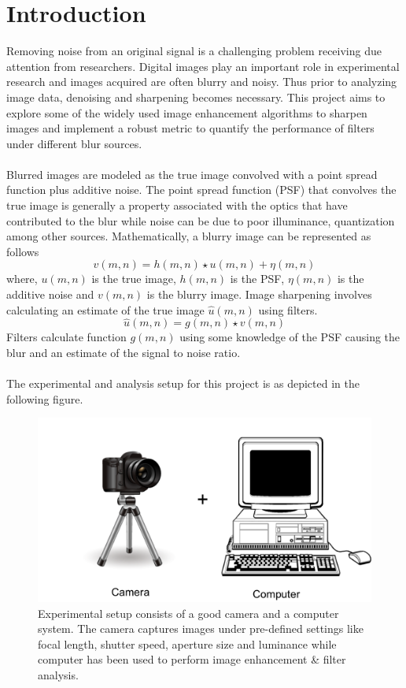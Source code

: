 \graphicspath{{put_your_path/}}%

\chapter{Introduction}
Removing noise from an original signal is a challenging problem receiving due attention from researchers. Digital images play an important role in experimental research and images acquired are often blurry and noisy. Thus prior to analyzing image data, denoising and sharpening becomes necessary. This project aims to explore some of the widely used image enhancement algorithms to sharpen images and implement a robust metric to quantify the performance of filters under different blur sources.\\

\\
Blurred images are modeled as the true image convolved with a point spread function plus additive noise. The point spread function (PSF) that convolves the true image is generally a property associated with the optics that have contributed to the blur while noise can be due to poor illuminance, quantization among other sources. Mathematically, a blurry image can be represented as follows\\
\begin{equation}
v(m,n)= h(m,n) \star u(m,n) + \eta(m,n)
\end{equation}
where, $u(m,n)$ is the true image, $h(m,n)$ is the PSF, $\eta(m,n)$ is the additive noise and $v(m,n)$ is the blurry image. Image sharpening involves calculating an estimate of the true image $\hat{u}(m,n)$ using filters.
\begin{equation}
\hat{u}(m,n)= g(m,n) \star v(m,n)
\end{equation}
Filters calculate function $g(m,n)$ using some knowledge of the PSF causing the blur and an estimate of the signal to noise ratio.\\

\\
The experimental and analysis setup for this project is as depicted in the following figure.
\begin{figure}[h!]
  \centering
                \centering
                \includegraphics[width=.5\textwidth]{experimental_setup.png}
                \caption{Experimental setup consists of a good camera and a computer system. The camera captures images under pre-defined settings like focal length, shutter speed, aperture size and luminance while computer has been used to perform image enhancement \& filter analysis.}
\end{figure}
\newpage